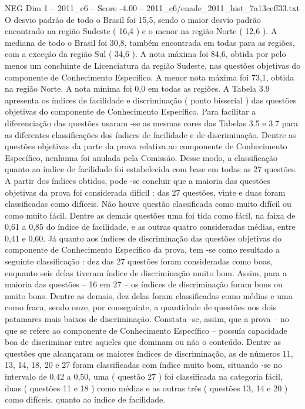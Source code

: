 \begin{textsample}{NEG Dim 1 – 2011\_c6 – Score -4.00 – 2011\_c6/enade\_2011\_hist\_7a13ceff33.txt}
O desvio padrão de todo o Brasil foi 15,5, sendo o maior desvio padrão encontrado na região Sudeste ( 16,4 ) e o menor na região Norte ( 12,6 ).
A mediana de todo o Brasil foi 30,8, também encontrada em todas para as regiões, com a exceção da região Sul ( 34,6 ).
A nota máxima foi 84,6, obtida por pelo menos um concluinte de Licenciatura da região Sudeste, nas questões objetivas do componente de Conhecimento Específico.
A menor nota máxima foi 73,1, obtida na região Norte.
A nota mínima foi 0,0 em todas as regiões.
A Tabela 3.9 apresenta os índices de facilidade e discriminação ( ponto bisserial ) das questões objetivas do componente de Conhecimento Específico.
Para facilitar a diferenciação das questões usaram -se as mesmas cores das Tabelas 3.5 e 3.7 para as diferentes classificações dos índices de facilidade e de discriminação.
Dentre as questões objetivas da parte da prova relativa ao componente de Conhecimento Específico, nenhuma foi anulada pela Comissão.
Desse modo, a classificação quanto ao índice de facilidade foi estabelecida com base em todas as 27 questões.
A partir dos índices obtidos, pode -se concluir que a maioria das questões objetivas da prova foi considerada difícil : das 27 questões, vinte e duas foram classificadas como difíceis.
Não houve questão classificada como muito difícil ou como muito fácil.
Dentre as demais questões uma foi tida como fácil, na faixa de 0,61 a 0,85 do índice de facilidade, e as outras quatro consideradas médias, entre 0,41 e 0,60.
Já quanto aos índices de discriminação das questões objetivas do componente de Conhecimento Específico da prova, tem -se como resultado a seguinte classificação : dez das 27 questões foram consideradas como boas, enquanto seis delas tiveram índice de discriminação muito bom.
Assim, para a maioria das questões – 16 em 27 – os índices de discriminação foram bons ou muito bons.
Dentre as demais, dez delas foram classificadas como médias e uma como fraca, sendo onze, por conseguinte, a quantidade de questões nos dois patamares mais baixos de discriminação.
Constata -se, assim, que a prova – no que se refere ao componente de Conhecimento Específico – possuía capacidade boa de discriminar entre aqueles que dominam ou não o conteúdo.
Dentre as questões que alcançaram os maiores índices de discriminação, as de números 11, 13, 14, 18, 20 e 27 foram classificadas com índice muito bom, situando -se no intervalo de 0,42 a 0,50, uma ( questão 27 ) foi classificada na categoria fácil, duas ( questões 11 e 18 ) como médias e as outras três ( questões 13, 14 e 20 ) como difíceis, quanto ao índice de facilidade.

\end{textsample}
